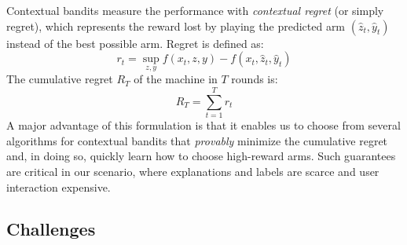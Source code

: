 \documentclass[letterpaper]{article} %
\begin{document}
Contextual bandits measure the performance with \emph{contextual regret} (or simply regret), which represents the reward lost by playing the predicted arm $(\hat{z}_t, \hat{y}_t)$ instead of the best possible arm. Regret is defined as: 
%
\[
    \textstyle
    r_t = \sup_{z, y} f(x_t, z, y) - f(x_t, \hat{z}_t, \hat{y}_t)
    \label{eq:reg}
\]
%
The cumulative regret $R_T$ of the machine in $T$ rounds is:
%
\[
    \textstyle
    R_T = \sum_{t = 1}^T r_t
    \label{eq:cumreg}
\]
%
A major advantage of this formulation is that it enables us to choose from several algorithms for contextual bandits that \emph{provably} minimize the cumulative regret and, in doing so, quickly learn how to choose high-reward arms.  Such guarantees are critical in our scenario, where explanations and labels are scarce and user interaction expensive.


\subsection{Challenges}
\end{document}
